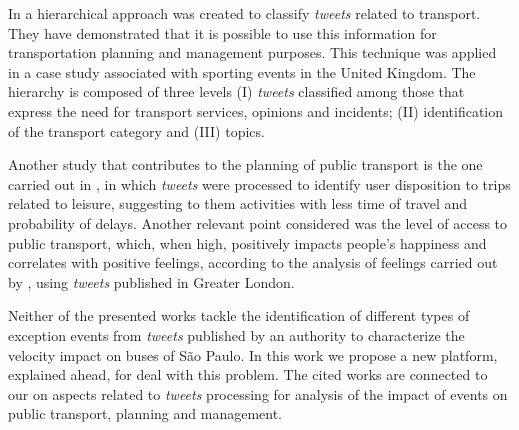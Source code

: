 \documentclass[runningheads]{llncs}
\begin{document}
In \cite{Gal-Tzur2014} a hierarchical approach was created to classify \textit{tweets} related to transport. They have demonstrated that it is possible to use this information for transportation planning and management purposes. This technique was applied in a case study associated with sporting events in the United Kingdom. The hierarchy is composed of three levels (I) \textit{tweets} classified among those that express the need for transport services, opinions and incidents; (II) identification of the transport category and (III) topics.

Another study that contributes to the planning of public transport is the one carried out in \cite {Gkiotsalitis2015, Gkiotsalitis2016}, in which \textit{tweets} were processed to identify user disposition to trips related to leisure, suggesting to them activities with less time of travel and probability of delays. Another relevant point considered was the level of access to public transport, which, when high, positively impacts people's happiness and correlates with positive feelings, according to the analysis of feelings carried out by \cite{Guo2016}, using \textit{tweets} published in Greater London.

Neither of the presented works tackle the identification of different types of exception events from \textit{tweets} published by an authority to characterize the velocity impact on buses of São Paulo. In this work we propose a new platform, explained ahead, for deal with this problem.
The cited works are connected to our on aspects related to \textit{tweets} processing for analysis of the impact of events on public transport, planning and management.

\end{document}
